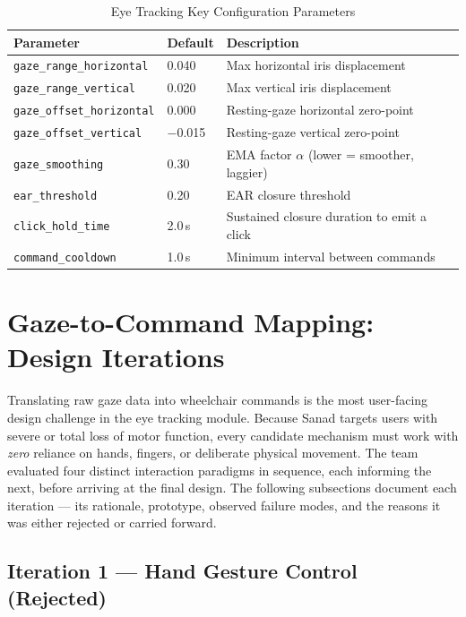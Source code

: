 \begin{table}[H]
\centering
\caption{Eye Tracking Key Configuration Parameters}
\label{tab:et_calib_params}
\begin{tabular}{lll}
\toprule
\textbf{Parameter} & \textbf{Default} & \textbf{Description} \\
\midrule
\texttt{gaze\_range\_horizontal} & 0.040   & Max horizontal iris displacement \\
\texttt{gaze\_range\_vertical}   & 0.020   & Max vertical iris displacement \\
\texttt{gaze\_offset\_horizontal}& 0.000   & Resting-gaze horizontal zero-point \\
\texttt{gaze\_offset\_vertical}  & $-$0.015 & Resting-gaze vertical zero-point \\
\texttt{gaze\_smoothing}         & 0.30    & EMA factor $\alpha$ (lower = smoother, laggier) \\
\texttt{ear\_threshold}          & 0.20    & EAR closure threshold \\
\texttt{click\_hold\_time}       & 2.0\,s  & Sustained closure duration to emit a click \\
\texttt{command\_cooldown}       & 1.0\,s  & Minimum interval between commands \\
\bottomrule
\end{tabular}
\end{table}

\section{Gaze-to-Command Mapping: Design Iterations}

Translating raw gaze data into wheelchair commands is the most user-facing design challenge
in the eye tracking module. Because Sanad targets users with severe or total loss of motor
function, every candidate mechanism must work with \textit{zero} reliance on hands, fingers,
or deliberate physical movement. The team evaluated four distinct interaction paradigms in
sequence, each informing the next, before arriving at the final design. The following
subsections document each iteration — its rationale, prototype, observed failure modes, and
the reasons it was either rejected or carried forward.

\subsection{Iteration 1 — Hand Gesture Control (Rejected)}

